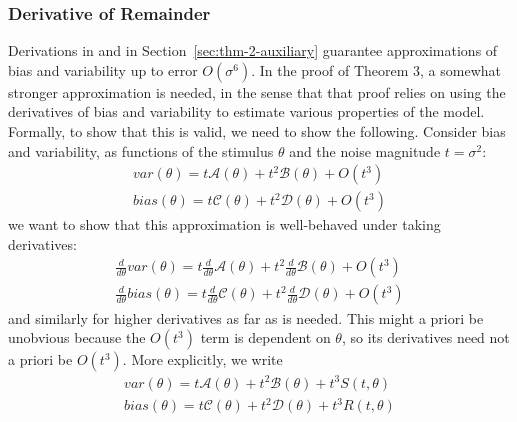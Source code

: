 \subsubsection{Derivative of Remainder}\label{sec:variance-two-derivatives}


Derivations in \citet{hahn2024unifying} and in Section~\ref{sec:thm-2-auxiliary} guarantee approximations of bias and variability up to error $O(\sigma^6)$.
In the proof of Theorem 3, a somewhat stronger approximation is needed, in the sense that that proof relies on using the derivatives of bias and variability to estimate various properties of the model.
Formally, to show that this is valid, we need to show the following.
Consider bias and variability, as functions of the stimulus $\theta$ and the noise magnitude $t = \sigma^2$:
    \begin{equation}
    \begin{aligned}
        var(\theta) = t \mathcal{A}(\theta) + t^2 \mathcal{B}(\theta) + O(t^3)\\
        bias(\theta) = t \mathcal{C}(\theta) + t^2 \mathcal{D}(\theta) + O(t^3) 
    \end{aligned}
    \end{equation}
    we want to show that this approximation is well-behaved under taking derivatives:
\begin{equation}\label{eq:well-behaved-remainder}
    \begin{aligned}
      \frac{d}{d\theta}  var(\theta) = t \frac{d}{d\theta}\mathcal{A}(\theta) + t^2 \frac{d}{d\theta}\mathcal{B}(\theta) + O(t^3)\\
      \frac{d}{d\theta}  bias(\theta) = t \frac{d}{d\theta}\mathcal{C}(\theta) + t^2 \frac{d}{d\theta}\mathcal{D}(\theta) + O(t^3) 
    \end{aligned}
    \end{equation}
    and similarly for higher derivatives as far as is needed.
    This might a priori be unobvious because the $O(t^3)$ term is dependent on $\theta$, so its derivatives need not a priori be $O(t^3)$.
    More explicitly, we write
    \begin{equation}
    \begin{aligned}
        var(\theta) = t \mathcal{A}(\theta) + t^2 \mathcal{B}(\theta) + t^3 S(t,\theta)\\
        bias(\theta) = t \mathcal{C}(\theta) + t^2 \mathcal{D}(\theta) + t^3 R(t,\theta) 
    \end{aligned}
    \end{equation}
